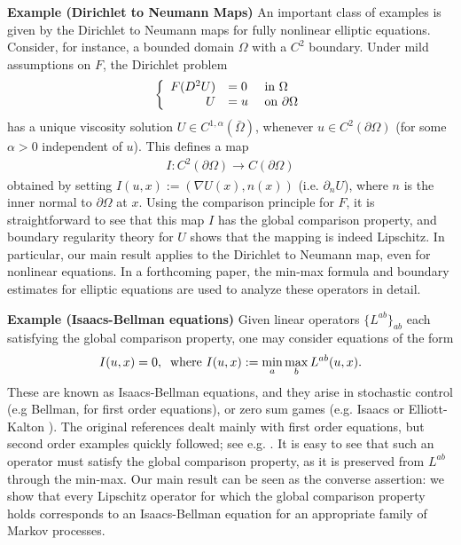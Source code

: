 \documentclass[11pt,reqno]{amsart}
\numberwithin{equation}{section}
\theoremstyle{plain}
\begin{document}
\textbf{Example (Dirichlet to Neumann Maps)} An important class of examples is given by the Dirichlet to Neumann maps for fully nonlinear elliptic equations. Consider, for instance, a bounded domain $\Omega$ with a $C^2$ boundary.  Under mild assumptions on $F$, the Dirichlet problem
\begin{align*}
  \left \{ \begin{array}{rll}	
    F(D^2U) & = 0 & \textnormal{ in } \Omega\\
    U & = u & \textnormal{ on } \partial \Omega
  \end{array}  \right.
\end{align*}
has a unique viscosity solution $U \in C^{1,\alpha}(\bar \Omega)$, whenever $u \in C^{2}(\partial \Omega)$ (for some $\alpha>0$ independent of $u$). This defines a map
\begin{align*}
  I:C^2(\partial \Omega) \to C(\partial \Omega)
\end{align*}
obtained by setting $I(u,x):= (\nabla U(x),n(x))$ (i.e. $\partial_n U$), where $n$ is the inner normal to $\partial \Omega$ at $x$. Using the comparison principle for $F$, it is straightforward to see that this map $I$ has the global comparison property, and boundary regularity theory for $U$ shows that the mapping is indeed Lipschitz.  In particular, our main result applies to the Dirichlet to Neumann map, even for nonlinear equations. In a forthcoming paper, the min-max formula and boundary estimates for elliptic equations are used to analyze these operators in detail.

\textbf{Example (Isaacs-Bellman equations)} Given linear operators $\{L^{ab}\}_{ab}$ each satisfying the global comparison property, one may consider equations of the form
\begin{align*}
  I(u,x)  = 0,\;\;\textnormal{where } I(u,x) := \min\limits_{a}\max\limits_{b} L^{ab}(u,x).	
\end{align*}	
These are known as Isaacs-Bellman equations, and they arise in stochastic control (e.g Bellman, \cite{Bell-1957} for first order equations), or zero sum games (e.g. Isaacs \cite{Isaacs-1965Book} or Elliott-Kalton \cite{ElliottKalton-1972Book}).  The original references dealt mainly with first order equations, but second order examples quickly followed; see e.g. \cite{FlemingRishel--1975Book}. It is easy to see that such an operator must satisfy the global comparison property, as it is preserved from $L^{ab}$ through the min-max. Our main result can be seen as the converse assertion: we show that every Lipschitz operator for which the global comparison property holds corresponds to an Isaacs-Bellman equation for an appropriate family of Markov processes. 
\end{document}
